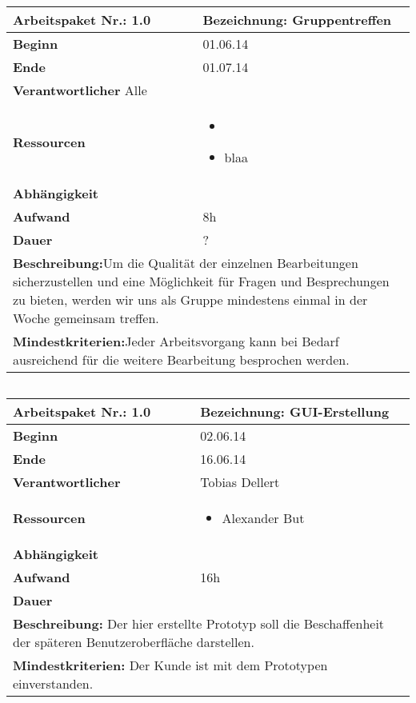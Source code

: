 \documentclass[fontsize=12pt,paper=a4,twoside]{scrartcl}
\begin{document}
\begin{tabular}{|p{5.3cm}|p{9.7cm}|}\hline
	\textbf{Arbeitspaket Nr.:} 1.0 & \textbf{Bezeichnung:} Gruppentreffen\\ \hline \hline
	\textbf{Beginn} & 01.06.14\\ \hline
	\textbf{Ende} &  01.07.14\\ \hline
	\textbf{Verantwortlicher} Alle \\ \hline
	\textbf{Ressourcen} & \begin{itemize}
		\item 
		\item blaa
	\end{itemize}    \\ \hline
	\textbf{Abhängigkeit} &\\ \hline
	\textbf{Aufwand} & 8h\\ \hline
	\textbf{Dauer} & ?\\ \hline
	\multicolumn{2}{|p{15cm}|}{\textbf{Beschreibung:}\newline  Um die Qualität der einzelnen Bearbeitungen sicherzustellen und eine Möglichkeit für Fragen und Besprechungen zu bieten, werden wir uns als Gruppe mindestens einmal in der Woche gemeinsam treffen. }\\ \hline
	\multicolumn{2}{|p{15cm}|}{\textbf{Mindestkriterien:}\newline Jeder Arbeitsvorgang kann bei Bedarf ausreichend für die weitere Bearbeitung besprochen werden. }\\ \hline
\end{tabular}

\begin{verbatim} 
\end{verbatim}

\begin{tabular}{|p{5.3cm}|p{9.7cm}|}\hline
	\textbf{Arbeitspaket Nr.:} 1.0 & \textbf{Bezeichnung:} GUI-Erstellung\\ \hline \hline
	\textbf{Beginn} & 02.06.14\\ \hline
	\textbf{Ende} & 16.06.14\\ \hline
	\textbf{Verantwortlicher} & Tobias Dellert\\ \hline
	\textbf{Ressourcen} & \begin{itemize}
		\item Alexander But
	\end{itemize}    \\ \hline
	\textbf{Abhängigkeit} &\\ \hline
	\textbf{Aufwand} & 16h\\ \hline
	\textbf{Dauer} & \\ \hline
	\multicolumn{2}{|p{15cm}|}{\textbf{Beschreibung:} Der hier erstellte Prototyp soll die Beschaffenheit der späteren Benutzeroberfläche darstellen. \newline   }\\ \hline
	\multicolumn{2}{|p{15cm}|}{\textbf{Mindestkriterien:} Der Kunde ist mit dem Prototypen einverstanden.\newline }\\ \hline
\end{tabular}
\end{document}

